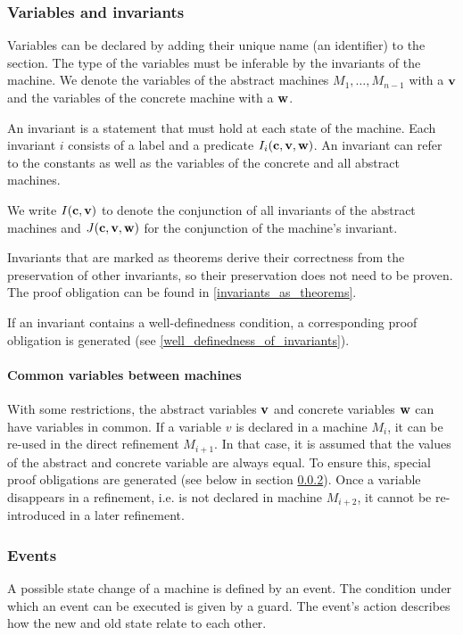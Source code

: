 \subsubsection{Variables and invariants}
\label{variables_and_invariants}
Variables can be declared by adding their unique name (an identifier) to the  section. 
The type of the variables must be inferable by the invariants of the machine.
We denote the variables of the abstract machines $M_1,\ldots,M_{n-1}$ with a $\mathbf{v}$ and the variables of the concrete machine with a $\mathbf{w}$.

An invariant is a statement that must hold at each state of the machine.
Each invariant $i$ consists of a label and a predicate $I_i(\mathbf{c},\mathbf{v},\mathbf{w})$.
An invariant can refer to the constants as well as the variables of the concrete and all abstract machines.

We write $I(\mathbf{c},\mathbf{v})$ to denote the conjunction of all invariants
of the abstract machines and $J(\mathbf{c},\mathbf{v},\mathbf{w})$ for the conjunction of the machine's invariant.

Invariants that are marked as theorems derive their correctness from the preservation
  of other invariants, so their preservation does not need to be proven.
The proof obligation can be found in \ref{invariants_as_theorems}.

If an invariant contains a well-definedness condition, 
  a corresponding proof obligation is generated (see \ref{well_definedness_of_invariants}).

\paragraph{Common variables between machines}
\label{common_variables}
With some restrictions, the abstract variables $\mathbf{v}$ and concrete
  variables $\mathbf{w}$ can have variables in common.
If a variable $v$ is declared in a machine $M_i$, it can be re-used in the
  direct refinement $M_{i+1}$. 
In that case, it is assumed that the values of the abstract and concrete variable 
  are always equal.
To ensure this, special proof obligations are generated (see below in section \ref{events}).
Once a variable disappears in a refinement, i.e. is not declared in machine $M_{i+2}$,
  it cannot be re-introduced in a later refinement.

\subsubsection{Events}
\label{events}
A possible state change of a machine is defined by an event.
The condition under which an event can be executed is given by a guard. The event's action
describes how the new and old state relate to each other.

